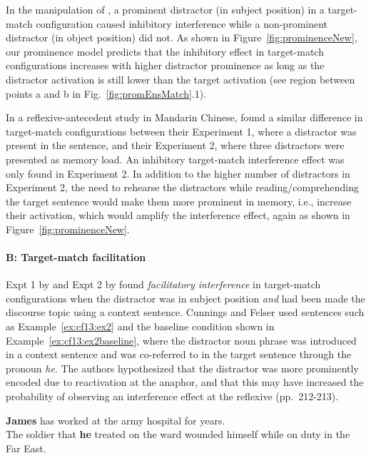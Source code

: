 \documentclass{cambridge7A}\usepackage[]{graphicx}\usepackage[]{color}
\begin{document}
In the manipulation of \cite{VanDykeMcElree2011}, a prominent distractor (in subject position) in a target-match configuration caused inhibitory interference while a non-prominent distractor (in object position) did not. As shown in Figure~\ref{fig:prominenceNew}, our prominence model predicts that the inhibitory effect in target-match configurations increases with higher distractor prominence as long as the distractor activation is still lower than the target activation (see region between points a and b in Fig.~\ref{fig:promEnsMatch}.1).

In a reflexive-antecedent study in Mandarin Chinese, \cite{JaegerEngelmannVasishth2015} found a similar difference in target-match configurations between their Experiment 1, where a distractor was present in the sentence, and their Experiment 2, where three distractors were presented as memory load. An inhibitory target-match interference effect was only found in Experiment 2. 
In addition to the higher number of distractors in Experiment 2, the need to rehearse the distractors 
while reading/comprehending the target sentence
 would make them more prominent in memory, i.e., increase their activation, which would amplify the interference effect, again as shown in Figure~\ref{fig:prominenceNew}.

\paragraph{B: Target-match facilitation}
Expt 1 by \cite{Sturt2003} and Expt 2 by \cite{CunningsFelser2013} found  \emph{facilitatory interference} in target-match configurations when the distractor was in subject position \emph{and} had been made the discourse topic using a context sentence.
Cunnings and Felser used sentences such as Example~\ref{ex:cf13:ex2} and the baseline condition shown in Example~\ref{ex:cf13:ex2baseline}, where the distractor noun phrase was introduced in a context sentence and was co-referred to in the target sentence through the pronoun \textit{he}. 
The authors hypothesized that the distractor was more prominently encoded due to reactivation at the anaphor, and that this may have increased the probability of observing an interference effect at the reflexive (pp.\ 212-213). 

\begin{exe} 
\ex\label{ex:cf13:ex2}
\textbf{James} has worked at the army hospital for years. \\
The soldier that \textbf{he} treated on the ward wounded himself while on duty in the Far East.
\end{exe}
\end{document}
